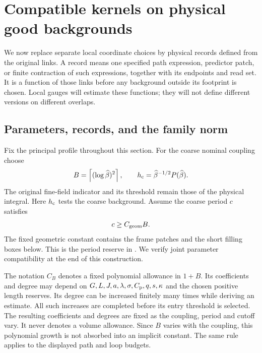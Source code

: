 \documentclass[11pt,reqno]{amsart}
\numberwithin{equation}{section}
\theoremstyle{definition}
\theoremstyle{remark}
\begin{document}
\section{Compatible kernels on physical good backgrounds}
\label{sec:compatible-physical-kernels}

We now replace separate local coordinate choices
by physical records defined from the original links.
A record means one specified path expression,
predictor patch, or finite contraction of such
expressions, together with its endpoints and read set.
It is a function of those links before any
background outside its footprint is chosen.
Local gauges will estimate these functions; they
will not define different versions on different
overlaps.

\subsection{Parameters, records, and the family norm}

Fix the principal profile throughout this section.
For the coarse nominal coupling choose
\begin{equation}
 B=\left\lceil(\log\widehat\beta)^2\right\rceil,\qquad
 h_{\rm c}=\widehat\beta^{-1/2}P(\widehat\beta).
 \label{eq:compatible-physical-parameters}
\end{equation}
The original fine-field indicator and its threshold
remain those of the physical integral.
Here \(h_{\rm c}\) tests the coarse background.
Assume the coarse period \(c\) satisfies
\begin{equation}
                         c\ge C_{\rm geom}B .
 \label{eq:compatible-period-reserve}
\end{equation}
The fixed geometric constant contains the frame
patches and the short filling boxes below.
This is the period reserve in
\cite[(25.1), p.~126]{Main}.
We verify joint parameter compatibility at the
end of this construction.

The notation \(C_B\) denotes a fixed polynomial
allowance in \(1+B\). Its coefficients and degree
may depend on
\(G,L,J,a,\lambda,\sigma,C_{\rm p},q,s,\kappa\)
and the chosen positive length reserves.
Its degree can be increased finitely many times while deriving
an estimate. All such increases are completed before its entry
threshold is selected. The resulting coefficients and degrees
are fixed as the coupling, period and cutoff vary.
It never denotes a volume allowance. Since \(B\) varies
with the coupling, this polynomial growth is not absorbed
into an implicit constant. The same rule applies to the
displayed path and loop budgets.
\end{document}
